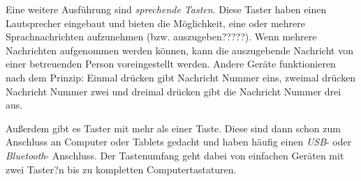             Eine weitere Ausführung sind \emph{sprechende Tasten}. Diese Taster haben einen Lautsprecher eingebaut und bieten die Möglichkeit, eine oder mehrere Sprachnachrichten aufzunehmen (bzw. auszugeben?????). Wenn mehrere Nachrichten aufgenommen werden können, kann die auszugebende Nachricht von einer betreuenden Person voreingestellt werden. Andere Geräte funktionieren nach dem Prinzip: Einmal drücken gibt Nachricht Nummer eins, zweimal drücken Nachricht Nummer zwei und dreimal drücken gibt die Nachricht Nummer drei aus.
            
        	Außerdem gibt es Taster mit mehr als einer Taste. Diese sind dann schon zum Anschluss an Computer oder Tablets gedacht und haben häufig einen \emph{USB}- oder \emph{Bluetooth}- Anschluss. Der Tastenumfang geht dabei von einfachen Geräten mit zwei Taster?n bis zu kompletten Computertastaturen.
            
